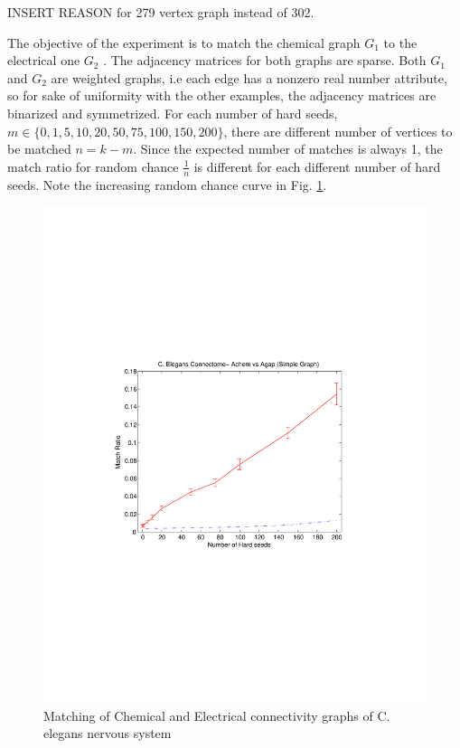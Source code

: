 \documentclass[12pt]{article}
\begin{document}
INSERT REASON for 279 vertex graph instead of 302.

The objective of the experiment is to match the chemical graph $G_1$ to  the electrical one $G_2$ .  The adjacency matrices for both graphs are sparse.  Both $G_1$ and $G_2$ are weighted graphs, i.e each edge has a nonzero real number attribute, so for sake of uniformity with the other examples, the adjacency matrices are binarized and symmetrized.  For each number of hard seeds, $m \in\{0,1,5,10,20,50,75,100,150,200\}$,  there are different number of vertices to be matched $n=k-m$. Since the expected number of matches is always 1, the match ratio for random chance $\frac{1}{n}$ is different for each different number of hard seeds. Note the increasing random chance curve in Fig. \ref{worm-fig}.
\begin{figure}
\centering
\includegraphics[scale=.8]{worm}
\caption{Matching of Chemical and Electrical connectivity graphs of C. elegans nervous system \label{worm-fig}  }
\end{figure}
\end{document}

